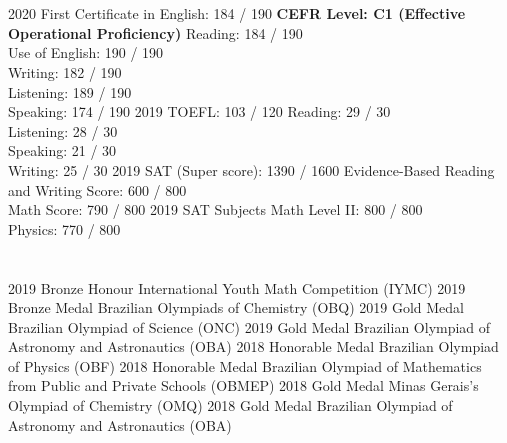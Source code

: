 \documentclass{cv}
\begin{document}
    \section*{}
        \begin{entrylist}
            \entry
                {2020}
                {First Certificate in English: 184 / 190}
                {\textbf{CEFR Level: C1 (Effective Operational     Proficiency)}}
                {Reading: 184 / 190\\ Use of English: 190 / 190\\ Writing: 182 / 190\\ Listening: 189 / 190\\ Speaking: 174 / 190}
            \entry
                {2019}
                {TOEFL: 103 / 120} 
                {}
                {Reading: 29 / 30\\ Listening: 28 / 30    \\ Speaking: 21 / 30\\ Writing: 25 / 30}
            \entry
                {2019}
                {SAT (Super score): 1390 / 1600} 
                {}
                {Evidence-Based Reading and Writing Score: 600 / 800\\ Math Score: 790 / 800}
            \entry
                {2019}
                {SAT Subjects}
                {}
                {Math Level II: 800 / 800\\ Physics: 770 / 800}
        \end{entrylist}
    \section*{}
        \begin{entrylist}
            \entry
                {2019}
                {Bronze Honour}
                {}
                {International Youth Math Competition (IYMC)}
            \entry
                {2019}
                {Bronze Medal}
                {}
                {Brazilian Olympiads of Chemistry (OBQ)}
            \entry
                {2019}
                {Gold Medal}
                {}
                {Brazilian Olympiad of Science (ONC)}
            \entry
                {2019}
                {Gold Medal}
                {}
                {Brazilian Olympiad of Astronomy and Astronautics (OBA)}
            \entry
                {2018}
                {Honorable Medal}
                {}
                {Brazilian Olympiad of Physics (OBF)}
            \entry
                {2018}
                {Honorable Medal}
                {}
                {Brazilian Olympiad of Mathematics from Public and Private Schools (OBMEP)}
            \entry
                {2018}
                {Gold Medal}
                {}
                {Minas Gerais's Olympiad of Chemistry (OMQ)}
            \entry
                {2018}
                {Gold Medal}
                {}
                {Brazilian Olympiad of Astronomy and Astronautics (OBA)}
        \end{entrylist}
\end{document}
